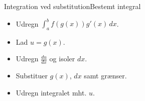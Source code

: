 \begin{frame}{Integration ved substitution}{Bestemt integral}
\begin{minipage}{0.47\textwidth}
	
	\begin{itemize}
		\setlength\itemsep{1em}
		\item<1-> Udregn $\int_a^b f(g(x))g'(x)\, dx$.
		\item<2-> Lad $u=g(x)$.
		\item<3-> Udregn $\frac{du}{dx}$ og isoler $dx$.
		\item<4-> Substituer $g(x)$, $dx$ samt grænser.
		\item<5-> Udregn integralet mht. $u$.
	\end{itemize}
\end{minipage}
\onslide<6->{%
\begin{minipage}{0.52\textwidth}
	\begin{itemize}
		\setlength\itemsep{1em}
		\item<6-> Udregn $\int_{-1}^2 -xe^{x^2}\, dx$.
		\item<7-> Lad $u=x^2$.
		\item<8-> Så er $\frac{du}{dx}=2x$ og $dx=\frac{du}{2x}$.
		\item<9-> $\int_{1}^4 -xe^{u}\, \frac{du}{2x}=-\frac{1}{2}\int_1^4 e^u\, du$
		\item<10-> $\frac{-1}{2}\int_1^4 e^u\, du=\frac{-1}{2}[e^u]_1^4=\frac{e-e^4}{2}$.
	\end{itemize}
\end{minipage}%
}
\end{frame}

